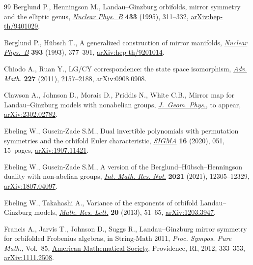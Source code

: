 \documentclass[10pt,a4paper]{amsart}
\numberwithin{equation}{section}
\begin{document}
\begin{thebibliography}{99}
Berglund P., Henningson M., Landau--{G}inzburg orbifolds, mirror symmetry and
 the elliptic genus, \href{https://doi.org/10.1016/0550-3213(94)00389-V}{\textit{Nuclear Phys.~B}} \textbf{433} (1995), 311--332,
 \href{https://arxiv.org/abs/hep-th/9401029}{arXiv:hep-th/9401029}.

Berglund P., H\"ubsch T., A generalized construction of mirror manifolds,
 \href{https://doi.org/10.1016/0550-3213(93)90250-S}{\textit{Nuclear Phys.~B}} \textbf{393} (1993), 377--391,
 \href{https://arxiv.org/abs/hep-th/9201014}{arXiv:hep-th/9201014}.

Chiodo A., Ruan Y., L{G}/{CY} correspondence: the state space isomorphism,
 \href{https://doi.org/10.1016/j.aim.2011.04.011}{\textit{Adv. Math.}} \textbf{227} (2011), 2157--2188, \href{https://arxiv.org/abs/0908.0908}{arXiv:0908.0908}.

Clawson A., Johnson D., Morais D., Priddis N., White C.B., Mirror map for
 {L}andau--{G}inzburg models with nonabelian groups, \href{https://doi.org/10.1016/j.geomphys.2024.105161}{\textit{J.~Geom. Phys.}},
 {t}o appear, \href{https://arxiv.org/abs/2302.02782}{arXiv:2302.02782}.

Ebeling W., Gusein-Zade S.M., Dual invertible polynomials with permutation
 symmetries and the orbifold {E}uler characteristic, \href{https://doi.org/10.3842/SIGMA.2020.051}{\textit{SIGMA}}
 \textbf{16} (2020), 051, 15~pages, \href{https://arxiv.org/abs/1907.11421}{arXiv:1907.11421}.

Ebeling W., Gusein-Zade S.M., A version of the
 {B}erglund--{H}\"ubsch--{H}enningson duality with non-abelian groups,
 \href{https://doi.org/10.1093/imrn/rnz167}{\textit{Int. Math. Res. Not.}} \textbf{2021} (2021), 12305--12329,
 \href{https://arxiv.org/abs/1807.04097}{arXiv:1807.04097}.

Ebeling W., Takahashi A., Variance of the exponents of orbifold
 {L}andau--{G}inzburg models, \href{https://doi.org/10.4310/MRL.2013.v20.n1.a5}{\textit{Math. Res. Lett.}} \textbf{20} (2013),
 51--65, \href{https://arxiv.org/abs/1203.3947}{arXiv:1203.3947}.

Francis A., Jarvis T., Johnson D., Suggs R., Landau--{G}inzburg mirror symmetry
 for orbifolded {F}robenius algebras, in String-{M}ath 2011, \textit{Proc.
 Sympos. Pure Math.}, Vol.~85, \href{https://doi.org/10.1090/pspum/085/1389}{American Mathematical Society}, Providence, RI,
 2012, 333--353, \href{https://arxiv.org/abs/1111.2508}{arXiv:1111.2508}.


\end{thebibliography}
\end{document}
